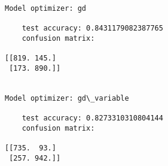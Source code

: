 \documentclass[11pt]{article}
\begin{document}
    \begin{Verbatim}[commandchars=\\\{\}]

Model optimizer: gd

	test accuracy: 0.8431179082387765
	confusion matrix: 

[[819. 145.]
 [173. 890.]]


Model optimizer: gd\_variable

	test accuracy: 0.8273310310804144
	confusion matrix: 

[[735.  93.]
 [257. 942.]]


    \end{Verbatim}


    
    
    
    
\end{document}

